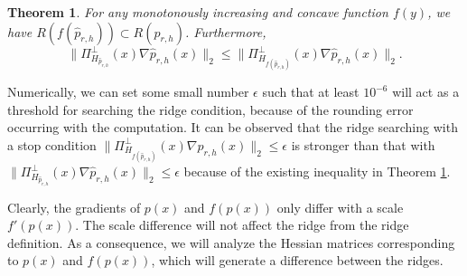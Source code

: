 \documentclass[aos,preprint]{imsart}
\newtheorem{theorem}{Theorem}[section]
\theoremstyle{remark}
\begin{document}
\begin{theorem}\label{inclusion}
For any monotonously increasing and concave function $f(y)$, we have $R({f(\hat{p}_{r,h})}) \subset R({\hat{p}_{r,h}})$. Furthermore, 
\[
\|\Pi_{H_{\hat{p}_{r,h}}}^\perp(x)\nabla \hat{p}_{r,h}(x)\|_2 \leq \|\Pi_{H_{f(\hat{p}_{r,h})}}^{\perp}(x)\nabla \hat{p}_{r,h}(x)\|_2.
\]
\end{theorem}

Numerically, we can set some small number $\epsilon$ such that at least $10^{-6}$ will act as a threshold for searching the ridge condition, because of the rounding error occurring with the computation. It can be observed that the ridge searching with a stop condition $\|\Pi_{H_{f(\hat{p}_{r,h})}}^{\perp}(x)\nabla \hat{p}_{r,h}(x)\|_2\leq \epsilon$ is stronger than that with $\|\Pi_{H_{\hat{p}_{r,h}}}^\perp(x)\nabla \hat{p}_{r,h}(x)\|_2\leq \epsilon$ because of the existing inequality in Theorem \ref{inclusion}.

Clearly, the gradients of $p(x)$ and $f(p(x))$ only differ with a scale $f'(p(x))$. The scale difference will not affect the ridge from the ridge definition. As a consequence, we will analyze the Hessian matrices corresponding to $p(x)$ and $f(p(x))$, which will generate a difference between the ridges.
\end{document}
